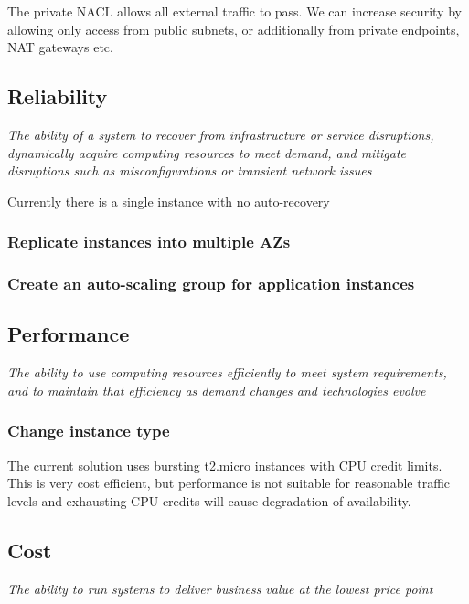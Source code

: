 The private NACL allows all external traffic to pass. We can increase security by allowing only access from public subnets, or additionally from private endpoints, NAT gateways etc.

\subsection{Reliability}

\textit{The ability of a system to recover from infrastructure or service disruptions, dynamically acquire computing resources to meet demand, and mitigate disruptions such as misconfigurations or transient network issues}

Currently there is a single instance with no auto-recovery

\subsubsection{Replicate instances into multiple AZs}

\subsubsection{Create an auto-scaling group for application instances}

\subsection{Performance}

\textit{The ability to use computing resources efficiently
	to meet system requirements, and to maintain that efficiency as demand changes and technologies evolve}

\subsubsection{Change instance type}

The current solution uses bursting t2.micro instances with CPU credit limits. This is very cost efficient, but performance is not suitable for reasonable traffic levels and exhausting CPU credits will cause degradation of availability.

\subsection{Cost} 

\textit{The ability to run systems to deliver business value at the lowest price point}





